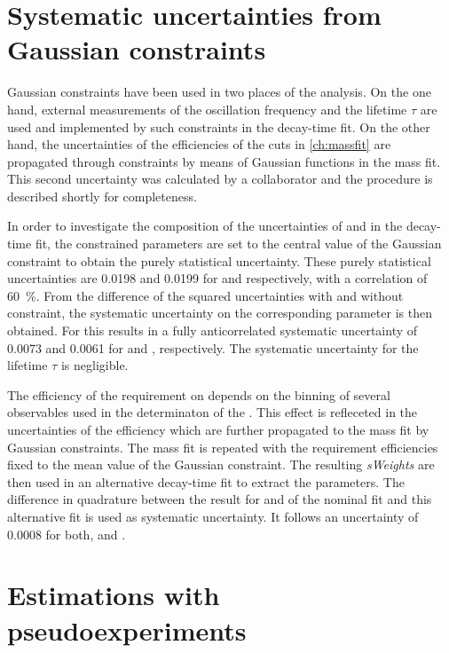 \section{Systematic uncertainties from Gaussian constraints}
\label{sec:SystUncertsGauss}

Gaussian constraints have been used in two places of the analysis.
On the one hand, external measurements of the \Bz oscillation frequency \dm and the \Bz lifetime $\tau$ are used and implemented by such constraints in the decay-time fit.
On the other hand, the uncertainties of the efficiencies of the \dllkpi cuts in \cref{ch:massfit} are propagated through constraints by means of Gaussian functions in the mass fit.
This second uncertainty was calculated by a collaborator and the procedure is described shortly for completeness.

In order to investigate the composition of the uncertainties of \Sf and \Sfbar in the decay-time fit, the constrained parameters are set to the central value of the Gaussian constraint to obtain the purely statistical uncertainty.
These purely statistical uncertainties are \num{0.0198} and \num{0.0199} for \Sf and \Sfbar respectively, with a correlation of \SI{60}{\percent}.
From the difference of the squared uncertainties with and without constraint, the systematic uncertainty on the corresponding parameter is then obtained.
For \dm this results in a fully anticorrelated systematic uncertainty of \num{0.0073} and \num{0.0061} for \Sf and \Sfbar, respectively.
The systematic uncertainty for the \Bz lifetime $\tau$ is negligible.

The efficiency of the requirement on \dllkpi depends on the binning of several observables used in the determinaton of the \dllkpi.
This effect is refleceted in the uncertainties of the efficiency which are further propagated to the mass fit by Gaussian constraints.
The mass fit is repeated with the \dllkpi requirement efficiencies fixed to the mean value of the Gaussian constraint.
The resulting \emph{sWeights} are then used in an alternative decay-time fit to extract the \CP parameters.
The difference in quadrature between the result for \Sf and \Sfbar of the nominal fit and this alternative fit is used as systematic uncertainty.
It follows an uncertainty of \num{0.0008} for both, \Sf and \Sfbar.

\section{Estimations with pseudoexperiments}
\label{sec:systUncertsPseudo}

